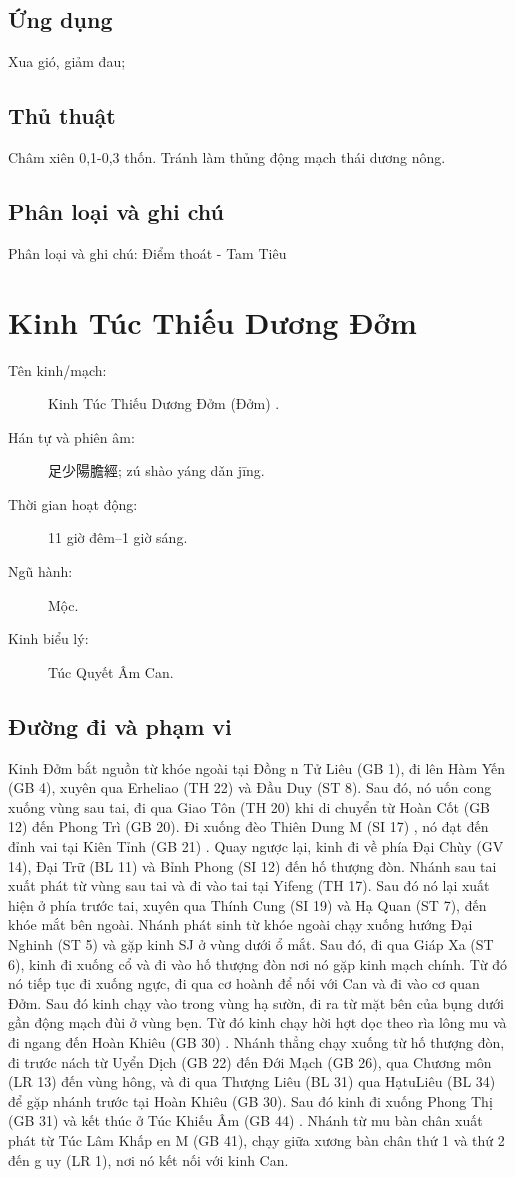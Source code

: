 \documentclass[12pt,a4paper]{article}
\begin{document}
\subsection*{Ứng dụng}Xua gió, giảm đau;
\subsection*{Thủ thuật}Châm xiên 0,1-0,3 thốn. Tránh làm thủng động mạch thái dương nông.
\subsection*{Phân loại và ghi chú}Phân loại và ghi chú: Điểm thoát - Tam Tiêu

\clearpage
\section{Kinh Túc Thiếu Dương Đởm}
\begin{description}
\item[Tên kinh/mạch:] Kinh Túc Thiếu Dương Đởm (Đởm) .
\item[Hán tự và phiên âm:] 足少陽膽經; zú shào yáng dǎn jīng.
\item[Thời gian hoạt động:] 11 giờ đêm--1 giờ sáng.
\item[Ngũ hành:] Mộc.
\item[Kinh biểu lý:] Túc Quyết Âm Can.
\end{description}
\subsection*{Đường đi và phạm vi}Kinh Đởm bắt nguồn từ khóe ngoài tại Đồng n Tử Liêu (GB 1), đi lên Hàm Yến (GB 4), xuyên qua Erheliao (TH 22) và Đầu Duy (ST 8). Sau đó, nó uốn cong xuống vùng sau tai, đi qua Giao Tôn (TH 20) khi di chuyển từ Hoàn Cốt (GB 12) đến Phong Trì (GB 20). Đi xuống đèo Thiên Dung M (SI 17) , nó đạt đến đỉnh vai tại Kiên Tỉnh (GB 21) . Quay ngược lại, kinh đi về phía Đại Chùy (GV 14), Đại Trữ (BL 11) và Bỉnh Phong (SI 12) đến hố thượng đòn. Nhánh sau tai xuất phát từ vùng sau tai và đi vào tai tại Yifeng (TH 17). Sau đó nó lại xuất hiện ở phía trước tai, xuyên qua Thính Cung (SI 19) và Hạ Quan (ST 7), đến khóe mắt bên ngoài. Nhánh phát sinh từ khóe ngoài chạy xuống hướng Đại Nghinh (ST 5) và gặp kinh SJ ở vùng dưới ổ mắt. Sau đó, đi qua Giáp Xa (ST 6), kinh đi xuống cổ và đi vào hố thượng đòn nơi nó gặp kinh mạch chính. Từ đó nó tiếp tục đi xuống ngực, đi qua cơ hoành để nối với Can và đi vào cơ quan Đởm. Sau đó kinh chạy vào trong vùng hạ sườn, đi ra từ mặt bên của bụng dưới gần động mạch đùi ở vùng bẹn. Từ đó kinh chạy hời hợt dọc theo rìa lông mu và đi ngang đến Hoàn Khiêu (GB 30) . Nhánh thẳng chạy xuống từ hố thượng đòn, đi trước nách từ Uyển Dịch (GB 22) đến Đới Mạch (GB 26), qua Chương môn (LR 13) đến vùng hông, và đi qua Thượng Liêu (BL 31) qua HạtuLiêu (BL 34) để gặp nhánh trước tại Hoàn Khiêu (GB 30). Sau đó kinh đi xuống Phong Thị (GB 31) và kết thúc ở Túc Khiếu Âm (GB 44) . Nhánh từ mu bàn chân xuất phát từ Túc Lâm Khấp en M (GB 41), chạy giữa xương bàn chân thứ 1 và thứ 2 đến g uy (LR 1), nơi nó kết nối với kinh Can.
\end{document}
